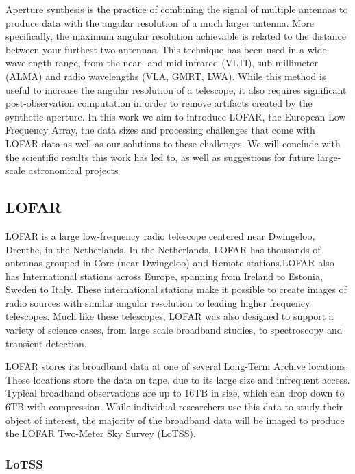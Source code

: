 Aperture synthesis is the practice of combining the signal of multiple antennas to produce data with the angular resolution of a much larger antenna. More specifically, the maximum angular resolution achievable is related to the distance between your furthest two antennas. This technique has been used in a wide wavelength range, from the near- and mid-infrared (VLTI), sub-millimeter (ALMA) and radio wavelengths (VLA, GMRT, LWA). While this method is useful to increase the angular resolution of a telescope, it also requires significant post-observation computation in order to remove artifacts created by the synthetic aperture. In this work we aim to introduce LOFAR, the European Low Frequency Array, the data sizes and processing challenges that come with LOFAR data as well as our solutions to these challenges. We will conclude with the scientific results this work has led to, as well as suggestions for future large-scale astronomical projects

\subsection{LOFAR}

LOFAR is a large low-frequency radio telescope centered near Dwingeloo, Drenthe, in the Netherlands. In the Netherlands, LOFAR has thousands of antennas grouped in Core (near Dwingeloo) and Remote stations.LOFAR also has International stations across Europe, spanning from Ireland to Estonia, Sweden to Italy. These international stations make it possible to create images of radio sources with similar angular resolution to leading higher frequency telescopes. Much like these telescopes, LOFAR was also designed to support a variety of science cases, from large scale broadband studies, to spectroscopy and transient detection. 

LOFAR stores its broadband data at one of several Long-Term Archive locations. These locations store the data on tape, due to its large size and infrequent access. Typical broadband observations are up to 16TB in size, which can drop down to 6TB with compression. While individual researchers use this data to study their object of interest, the majority of the broadband data will be imaged to produce the LOFAR Two-Meter Sky Survey (LoTSS). 

\subsubsection{LoTSS} 

